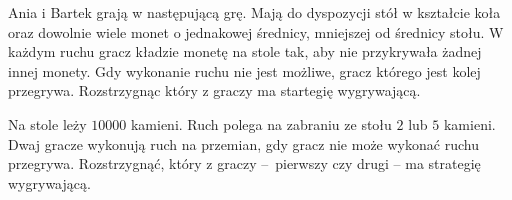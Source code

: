 



Ania i Bartek grają w następującą grę. Mają do dyspozycji stół w kształcie koła oraz dowolnie wiele monet o jednakowej średnicy, mniejszej od średnicy stołu. W każdym ruchu gracz kładzie monetę na stole tak, aby nie przykrywała żadnej innej monety. Gdy wykonanie ruchu nie jest możliwe, gracz którego jest kolej przegrywa. Rozstrzygnąc który z graczy ma startegię wygrywającą.






Na stole leży $10000$ kamieni. Ruch polega na zabraniu ze stołu $2$ lub $5$ kamieni. Dwaj gracze wykonują ruch na przemian, gdy gracz nie może wykonać ruchu przegrywa. Rozstrzygnąć, który z graczy – pierwszy czy drugi – ma strategię wygrywającą.




